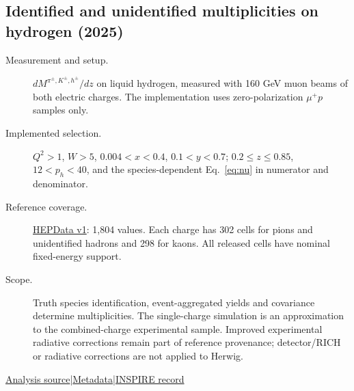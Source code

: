 \documentclass[11pt,a4paper]{article}
\newcommand{\id}[1]{{\small\texttt{\detokenize{#1}}}}
\begin{document}
\subsection{\texorpdfstring{Identified and unidentified multiplicities on hydrogen (2025)}{Identified and unidentified multiplicities on hydrogen (2025)}}
\id{COMPASS_2025_I2840545}\quad\cite{r2840545}
\begin{description}
\item[Measurement and setup.] $dM^{\pi^\pm,K^\pm,h^\pm}/dz$ on liquid hydrogen, measured with 160 GeV muon beams of both electric charges. The implementation uses zero-polarization $\mu^+p$ samples only.
\item[Implemented selection.] $Q^2>1$, $W>5$, $0.004<x<0.4$, $0.1<y<0.7$; $0.2\le z\le0.85$, $12<p_h<40$, and the species-dependent Eq.~\eqref{eq:nu} in numerator and denominator.
\item[Reference coverage.] \href{https://www.hepdata.net/record/ins2840545?version=1}{HEPData v1}: 1,804 values. Each charge has 302 cells for pions and unidentified hadrons and 298 for kaons. All released cells have nominal fixed-energy support.
\item[Scope.] Truth species identification, event-aggregated yields and covariance determine multiplicities. The single-charge simulation is an approximation to the combined-charge experimental sample. Improved experimental radiative corrections remain part of reference provenance; detector/RICH or radiative corrections are not applied to Herwig.
\end{description}
{\small\href{https://github.com/apapaefs/HerwigPolarizedPheno/blob/105045bd757aaa6b217e87811dc5f9a22a8d1cef/analyses/rivet/dis/COMPASS_2025_I2840545.cc}{Analysis source}\quad|\quad\href{https://github.com/apapaefs/HerwigPolarizedPheno/blob/105045bd757aaa6b217e87811dc5f9a22a8d1cef/analyses/rivet/dis/COMPASS_2025_I2840545.info}{Metadata}\quad|\quad\href{https://inspirehep.net/literature/2840545}{INSPIRE record}}

\clearpage
{}
\end{document}

